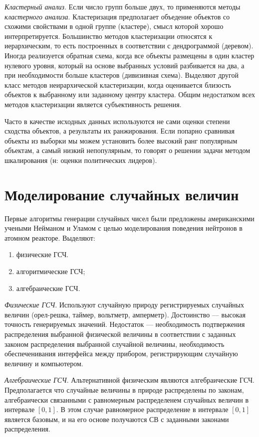 \documentclass[12pt]{article}
\begin{document}
\emph{Кластерный анализ}. Если число групп больше двух, то применяются методы \emph{кластерного анализа}. Кластеризация предполагает объедение объектов со схожими свойствами в одной группе (кластере), смысл которой хорошо интерпретируется. Большинство методов кластеризации относятся к иерархическим, то есть построенных в соответствии с дендрограммой (деревом). Иногда реализуется обратная схема, когда все объекты размещены в один кластер нулевого уровня, который на основе выбранных условий разбивается на два, а при необходимости больше кластеров (дивизивная схема). Выделяют другой класс методов неирархической кластеризации, когда оценивается близость объектов к выбранному или заданному центру кластера. Общим недостатком всех методов кластеризации является субъективность решения.

Часто в качестве исходных данных используются не сами оценки степени сходства объектов, а результаты их ранжирования. Если попарно сравнивая объекты из выборки мы можем установить более высокий ранг популярным объектам, а самый низкий непопулярным, то говорят о решении задачи методом шкалирования (н: оценки политических лидеров).

\newpage
\section{Моделирование случайных величин}
Первые алгоритмы генерации случайных чисел были предложены американскими учеными Нейманом и Уламом с целью моделирования поведения нейтронов в атомном реакторе. Выделяют:
\begin{enumerate}
    \item физические ГСЧ.
    \item алгоритмические ГСЧ;
    \item алгебраические ГСЧ.
\end{enumerate}

\emph{Физические ГСЧ}. Используют случайную природу регистрируемых случайных величин (орел-решка, таймер, вольтметр, амперметр). Достоинство --- высокая точность генерируемых значений. Недостаток --- необходимость подтвержения распределения выбранной физической величины в соответствии с заданных законом распределения выбранной случайной величины, необходимость обеспеченивания интерфейса между прибором, регистрирующим случайную величину и компьютером.

\emph{Алгебраические ГСЧ}. Альтернативной физическим являются алгебраические ГСЧ. Предполагается что случайные величины в природе распределены по законам, алгебраически связанными с равномерным распределенем случайных величин в интервале $[0, 1]$. В этом случае равномерное распределение в интервале $[0, 1]$ является базовым, и на его основе получаются СВ с заданными законами распределения.
\end{document}

